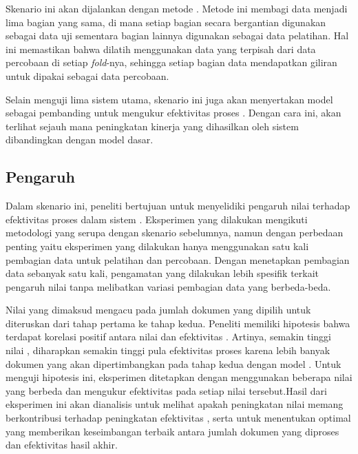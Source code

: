 Skenario ini akan dijalankan dengan metode \fcv{}. Metode ini membagi data menjadi lima bagian yang sama, di mana setiap bagian secara bergantian digunakan sebagai data uji sementara bagian lainnya digunakan sebagai data pelatihan. Hal ini memastikan bahwa \reranker{} dilatih menggunakan data yang terpisah dari data percobaan \retrieval{} di setiap \textit{fold}-nya, sehingga setiap bagian data mendapatkan giliran untuk dipakai sebagai data percobaan.

Selain menguji lima sistem utama, skenario ini juga akan menyertakan model \base{} \retriever{} sebagai pembanding untuk mengukur efektivitas proses \retrieval{}. Dengan cara ini, akan terlihat sejauh mana peningkatan kinerja yang dihasilkan oleh sistem \cascaded{} \ir{} dibandingkan dengan model dasar.





\subsection{Pengaruh \Cutoff{}}
\label{subbab:5::Pengaruh Cut-off}
Dalam skenario ini, peneliti bertujuan untuk menyelidiki pengaruh nilai \cutoff{} terhadap efektivitas proses \retrieval{} dalam sistem \cascaded{} \ir{}. Eksperimen yang dilakukan mengikuti metodologi yang serupa dengan skenario sebelumnya, namun dengan perbedaan penting yaitu eksperimen yang dilakukan hanya menggunakan satu kali pembagian data untuk pelatihan dan percobaan. Dengan menetapkan pembagian data sebanyak satu kali, pengamatan yang dilakukan lebih spesifik terkait pengaruh nilai \cutoff{} tanpa melibatkan variasi pembagian data yang berbeda-beda.

Nilai \cutoff{} yang dimaksud mengacu pada jumlah dokumen yang dipilih untuk diteruskan dari tahap \ranking{} pertama ke tahap kedua. Peneliti memiliki hipotesis bahwa terdapat korelasi positif antara nilai \cutoff{} dan efektivitas \retrieval{}. Artinya, semakin tinggi nilai \cutoff{}, diharapkan semakin tinggi pula efektivitas proses \retrieval{} karena lebih banyak dokumen yang akan dipertimbangkan pada tahap \ranking{} kedua dengan model \lambdamart{}. Untuk menguji hipotesis ini, eksperimen ditetapkan dengan menggunakan beberapa nilai \cutoff{} yang berbeda dan mengukur efektivitas pada setiap nilai tersebut.Hasil dari eksperimen ini akan dianalisis untuk melihat apakah peningkatan nilai \cutoff{} memang berkontribusi terhadap peningkatan efektivitas \retrieval{}, serta untuk menentukan \cutoff{} optimal yang memberikan keseimbangan terbaik antara jumlah dokumen yang diproses dan efektivitas hasil akhir.





